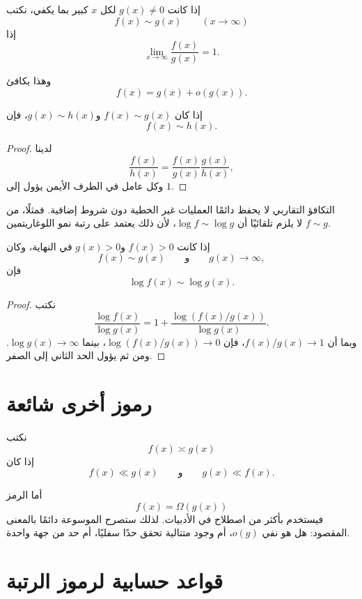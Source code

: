 \begin{definition}
إذا كانت \(g(x)\neq0\) لكل \(x\) كبير بما يكفي، نكتب
\[
f(x)\sim g(x)
\qquad (x\to\infty)
\]
إذا
\[
\lim_{x\to\infty}\frac{f(x)}{g(x)}=1.
\]
\end{definition}

وهذا يكافئ
\[
f(x)=g(x)+o(g(x)).
\]

\begin{proposition}
\label{prop:asymptotic-equivalence-transitive}
\provedhere
إذا كان \(f(x)\sim g(x)\) و\(g(x)\sim h(x)\)، فإن
\[
f(x)\sim h(x).
\]
\end{proposition}

\begin{proof}
لدينا
\[
\frac{f(x)}{h(x)}
=
\frac{f(x)}{g(x)}
\frac{g(x)}{h(x)},
\]
وكل عامل في الطرف الأيمن يؤول إلى \(1\).
\end{proof}

\begin{remark}
التكافؤ التقاربي لا يحفظ دائمًا العمليات غير الخطية دون شروط إضافية. فمثلًا، من \(f\sim g\) لا يلزم تلقائيًا أن \(\log f\sim\log g\)، لأن ذلك يعتمد على رتبة نمو اللوغاريتمين.
\end{remark}

\begin{proposition}
\label{prop:logs-preserve-asymptotic-equivalence}
\provedhere
إذا كانت \(f(x)>0\) و\(g(x)>0\) في النهاية، وكان
\[
f(x)\sim g(x)
\qquad\text{و}\qquad
g(x)\to\infty,
\]
فإن
\[
\log f(x)\sim\log g(x).
\]
\end{proposition}

\begin{proof}
نكتب
\[
\frac{\log f(x)}{\log g(x)}
=
1+
\frac{\log(f(x)/g(x))}{\log g(x)}.
\]
وبما أن \(f(x)/g(x)\to1\)، فإن \(\log(f(x)/g(x))\to0\)، بينما
\(\log g(x)\to\infty\). ومن ثم يؤول الحد الثاني إلى الصفر.
\end{proof}

\section{رموز أخرى شائعة}

نكتب
\[
f(x)\asymp g(x)
\]
إذا كان
\[
f(x)\ll g(x)
\qquad\text{و}\qquad
g(x)\ll f(x).
\]

أما الرمز
\[
f(x)=\Omega(g(x))
\]
فيستخدم بأكثر من اصطلاح في الأدبيات. لذلك ستصرح الموسوعة دائمًا بالمعنى المقصود: هل هو نفي \(o(g)\)، أم وجود متتالية تحقق حدًا سفليًا، أم حد من جهة واحدة.

\section{قواعد حسابية لرموز الرتبة}

